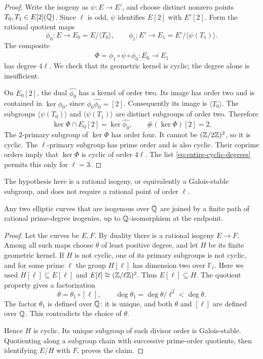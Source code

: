 \begin{proof}
Write the isogeny as $\psi:E\to E'$, and choose distinct nonzero points
$T_0,T_1\in E[2](\mathbb Q)$. Since $\ell$ is odd, $\psi$ identifies
$E[2]$ with $E'[2]$. Form the rational quotient maps
\[
 \phi_0:E\longrightarrow E_0=E/\langle T_0\rangle,\qquad
 \phi_1:E'\longrightarrow E_1=E'/\langle\psi(T_1)\rangle.
\]
The composite
\[
 \Phi=\phi_1\circ\psi\circ\widehat{\phi_0}:E_0\longrightarrow E_1
\]
has degree $4\ell$. We check that its geometric kernel is cyclic;
the degree alone is insufficient.

On $E_0[2]$, the dual $\widehat{\phi_0}$ has a kernel of order two.
Its image has order two and is contained in $\ker\phi_0$, since
$\phi_0\widehat{\phi_0}=[2]$. Consequently its image is
$\langle T_0\rangle$. The subgroups
$\langle\psi(T_0)\rangle$ and $\langle\psi(T_1)\rangle$ are distinct
subgroups of order two. Therefore
\[
 \ker\Phi\cap E_0[2]=\ker\widehat{\phi_0},\qquad
 \#(\ker\Phi)[2]=2.
\]
The $2$-primary subgroup of $\ker\Phi$ has order four. It cannot be
$(\mathbb Z/2\mathbb Z)^2$, so it is cyclic. The $\ell$-primary subgroup has prime
order and is also cyclic. Their coprime orders imply that $\ker\Phi$
is cyclic of order $4\ell$. The list
\eqref{eq:entire-cyclic-degrees} permits this only for $\ell=3$.
\end{proof}

The hypothesis here is a rational isogeny, or equivalently a
Galois-stable subgroup, and does not require a rational point of order
$\ell$.

\begin{lemma}\label{lem:entire-prime-path}
Any two elliptic curves that are isogenous over $\mathbb Q$ are joined by a
finite path of rational prime-degree isogenies, up to
$\mathbb Q$-isomorphism at the endpoint.
\end{lemma}

\begin{proof}
Let the curves be $E,F$. By duality there is a rational isogeny
$E\to F$. Among all such maps choose $\theta$ of least positive degree,
and let $H$ be its finite geometric kernel. If $H$ is not cyclic, one
of its primary subgroups is not cyclic, and for some prime $\ell$ the
group $H[\ell]$ has dimension two over $\mathbb F_\ell$.
Here we used $H[\ell]\subseteq E[\ell]$ and
$E[\ell]\cong(\mathbb Z/\ell\mathbb Z)^2$. Thus $E[\ell]\subseteq H$.
The quotient property gives a factorization
\[
 \theta=\theta_1\circ[\ell],\qquad
 \deg\theta_1=\deg\theta/\ell^2<\deg\theta.
\]
The factor $\theta_1$ is defined over $\mathbb Q$: it is unique, and both
$\theta$ and $[\ell]$ are defined over $\mathbb Q$. This contradicts the
choice of $\theta$.

Hence $H$ is cyclic. Its unique subgroup of each divisor order is
Galois-stable. Quotienting along a subgroup chain with successive
prime-order quotients, then identifying $E/H$ with $F$, proves the
claim.
\end{proof}

